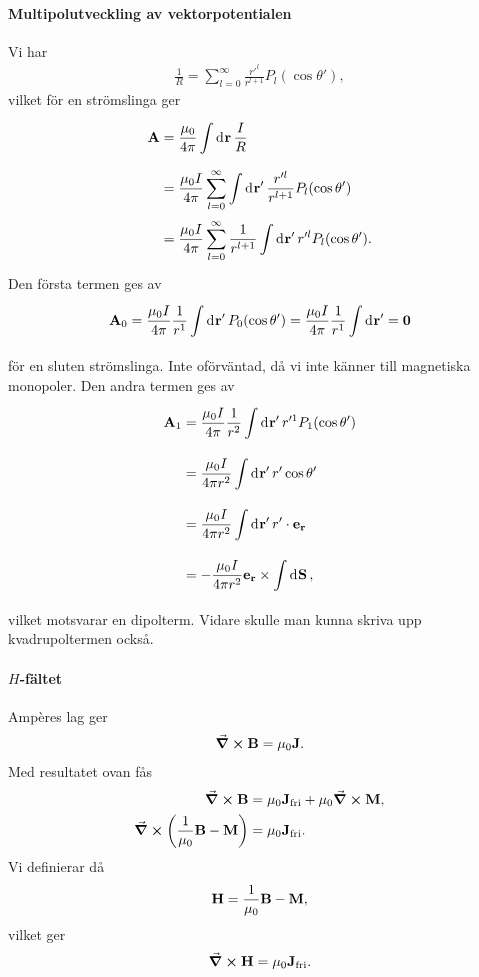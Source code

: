 \paragraph{Multipolutveckling av vektorpotentialen}
Vi har
\begin{align*}
	\frac{1}{R} = \sum\limits_{l = 0}^{\infty}\frac{r'^{l}}{r^{l + 1}}P_{l}(\cos{\theta'}),
\end{align*}
vilket för en strömslinga ger
\begin{align*}
	\vb{A} &= \frac{\mu_{0}}{4\pi}\int\limits_{}^{}\dd[]{\vb{r}}\frac{I}{R} \\
	       &= \frac{\mu_{0}I}{4\pi}\sum\limits_{l = 0}^{\infty}\int\limits_{}^{}\dd[]{\vb{r}'}\frac{r'^{l}}{r^{l + 1}}P_{l}(\cos{\theta'}) \\
	       &= \frac{\mu_{0}I}{4\pi}\sum\limits_{l = 0}^{\infty}\frac{1}{r^{l + 1}}\int\limits_{}^{}\dd[]{\vb{r}'}r'^{l}P_{l}(\cos{\theta'}).
\end{align*}
Den första termen ges av
\begin{align*}
	\vb{A}_{0} = \frac{\mu_{0}I}{4\pi}\frac{1}{r^{1}}\int\limits_{}^{}\dd[]{\vb{r}'}P_{0}(\cos{\theta'}) = \frac{\mu_{0}I}{4\pi}\frac{1}{r^{1}}\int\limits_{}^{}\dd[]{\vb{r}'} = \vb{0}
\end{align*}
för en sluten strömslinga. Inte oförväntad, då vi inte känner till magnetiska monopoler. Den andra termen ges av
\begin{align*}
	\vb{A}_{1} &= \frac{\mu_{0}I}{4\pi}\frac{1}{r^{2}}\int\limits_{}^{}\dd[]{\vb{r}'}r'^{1}P_{1}(\cos{\theta'}) \\
	           &= \frac{\mu_{0}I}{4\pi r^{2}}\int\limits_{}^{}\dd[]{\vb{r}'}r'\cos{\theta'} \\
	           &= \frac{\mu_{0}I}{4\pi r^{2}}\int\limits_{}^{}\dd[]{\vb{r}'}r'\cdot\vb{e}_{\vb{r}} \\
	           &= -\frac{\mu_{0}I}{4\pi r^{2}}\vb{e}_{\vb{r}}\times\int\limits_{}^{}\dd[]{\vb{S}},
\end{align*}
vilket motsvarar en dipolterm. Vidare skulle man kunna skriva upp kvadrupoltermen också.

\paragraph{$H$-fältet}
Ampères lag ger
\begin{align*}
	\curl{\vb{B}} = \mu_{0}\vb{J}.
\end{align*}
Med resultatet ovan fås
\begin{align*}
	\curl{\vb{B}}                           &= \mu_{0}\vb{J}_{\text{fri}} + \mu_{0}\curl{\vb{M}}, \\
	\curl(\frac{1}{\mu_{0}}\vb{B} - \vb{M}) &= \mu_{0}\vb{J}_{\text{fri}}.
\end{align*}
Vi definierar då
\begin{align*}
	\vb{H} = \frac{1}{\mu_{0}}\vb{B} - \vb{M},
\end{align*}
vilket ger
\begin{align*}
	\curl{\vb{H}} = \mu_{0}\vb{J}_{\text{fri}}.
\end{align*}

